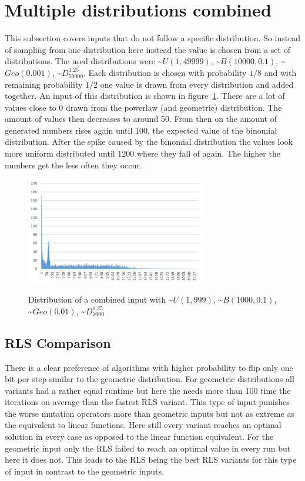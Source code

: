 \section{Multiple distributions combined}
This subsection covers inputs that do not follow a specific distribution.
So instead of sampling from one distribution here instead the value is chosen from a set of distributions.
The used distributions were \textasciitilde$U(1,49999)$, \textasciitilde$B(10000,0.1)$, \textasciitilde$Geo(0.001)$, \textasciitilde$D^{1.25}_{50000}$.
Each distribution is chosen with probability $1/8$ and with remaining probability $1/2$ one value is drawn from every distribution and added together.
An input of this distribution is shown in figure~\ref{fig:mixAndOverlDistExample}.
There are a lot of values close to 0 drawn from the powerlaw (and geometric) distribution.
The amount of values then decreases to around 50.
From then on the amount of generated numbers rises again until 100, the expected value of the binomial distribution.
After the spike caused by the binomial distribution the values look more uniform distributed until 1200 where they fall of again.
The higher the numbers get the less often they occur.

\begin{figure}[h]
      \caption{Distribution of a combined input with \textasciitilde$U(1,999)$, \textasciitilde$B(1000,0.1)$, \textasciitilde$Geo(0.01)$, \textasciitilde$D^{1.25}_{1000}$}
      \centering
      \includegraphics[width=0.7\textwidth]{figures/images/numberGenerator/mixedAndOverlapped.png}\label{fig:mixAndOverlDistExample}
\end{figure}

\subsection{RLS Comparison}


There is a clear preference of algorithms with higher probability to flip only one bit per step similar to the geometric distribution.
For geometric distributions all variants had a rather equal runtime but here the \RLSN[4] needs more than 100 time the iterations on average than the fastest RLS variant.
This type of input punishes the worse mutation operators more than geometric inputs but not as extreme as the equivalent to linear functions.
Here still every variant reaches an optimal solution in every case as opposed to the linear function equivalent.
For the geometric input only the RLS failed to reach an optimal value in every run but here it does not.
This leads to the RLS being the best RLS variants for this type of input in contrast to the geometric inputs.
